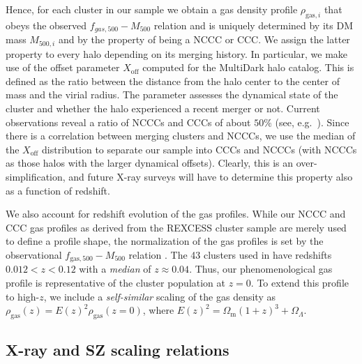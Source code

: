 \documentclass[traditabstract]{aa}
\newcommand{\rmn}{\mathrm}
\begin{document}
Hence, for each cluster in our sample we obtain a gas density profile
$\rho_{\rmn{gas},i}$ that obeys the observed $f_{gas,500}-M_{500}$ relation and
is uniquely determined by its DM mass $M_{500,i}$ and by the property of being a
NCCC or CCC. We assign the latter property to every halo depending on its
merging history. In particular, we make use of the offset parameter
$X_{\rmn{off}}$ computed for the MultiDark halo catalog. This is defined as the
ratio between the distance from the halo center to the center of mass and the
virial radius. The parameter assesses the dynamical state of the cluster and
whether the halo experienced a recent merger or not. Current observations reveal
a ratio of NCCCs and CCCs of about $50\%$ (see, e.g.~\citealp{2007A&A...466..805C,
  2009MNRAS.395..764S}). Since there is a correlation between merging clusters
and NCCCs, we use the median of the $X_{\rmn{off}}$ distribution to separate our
sample into CCCs and NCCCs (with NCCCs as those halos with the larger dynamical
offsets). Clearly, this is an over-simplification, and future X-ray surveys will
have to determine this property also as a function of redshift.

We also account for redshift evolution of the gas profiles. While our NCCC and
CCC gas profiles as derived from the REXCESS cluster sample are merely used to
define a profile shape, the normalization of the gas profiles is set by the
observational $f_{\rmn{gas},500}-M_{500}$ relation \citep{2009ApJ...693.1142S}.
The 43 clusters used in \cite{2009ApJ...693.1142S} have redshifts $0.012 < z <
0.12$ with a \emph{median} of $z \approx 0.04$. Thus, our phenomenological gas
profile is representative of the cluster population at $z=0$. To extend this
profile to high-$z$, we include a \emph{self-similar} scaling of the gas density
as $\rho_{\rmn{gas}}(z) = E(z)^{2} \rho_{\rmn{gas}}(z=0)$, where $E(z)^{2} =
\Omega_{\rmn{m}} (1+z)^{3} + \Omega_{{\Lambda}}$.


\subsection{X-ray and SZ scaling relations}
\label{sec:X-SZ-scaling}
\end{document}
